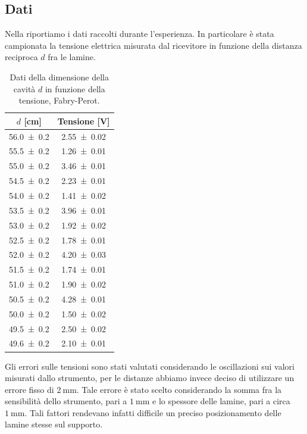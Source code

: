 \documentclass[a4paper]{article}
\begin{document}
\subsection{Dati}
Nella  riportiamo i dati raccolti durante l'esperienza. In particolare è stata campionata la tensione elettrica misurata dal ricevitore in funzione della distanza reciproca $d$ fra le lamine.
\begin{table}[H]
\centering
\caption{Dati della dimensione della cavità $d$ in funzione della tensione, Fabry-Perot.}
\label{tab:dati_Fabry_Perot}
\begin{tabular}{|c|c|}
\hline $d$ [\si{\centi\metre}] & Tensione [\si{\volt}] \\
\hline
\num{56.0 \pm 0.2} & \num{2.55 \pm 0.02} \\
\num{55.5 \pm 0.2} & \num{1.26 \pm 0.01} \\
\num{55.0 \pm 0.2} & \num{3.46 \pm 0.01} \\
\num{54.5 \pm 0.2} & \num{2.23 \pm 0.01} \\
\num{54.0 \pm 0.2} & \num{1.41 \pm 0.02} \\
\num{53.5 \pm 0.2} & \num{3.96 \pm 0.01} \\
\num{53.0 \pm 0.2} & \num{1.92 \pm 0.02} \\
\num{52.5 \pm 0.2} & \num{1.78 \pm 0.01} \\
\num{52.0 \pm 0.2} & \num{4.20 \pm 0.03} \\
\num{51.5 \pm 0.2} & \num{1.74 \pm 0.01} \\
\num{51.0 \pm 0.2} & \num{1.90 \pm 0.02} \\
\num{50.5 \pm 0.2} & \num{4.28 \pm 0.01} \\
\num{50.0 \pm 0.2} & \num{1.50 \pm 0.02} \\
\num{49.5 \pm 0.2} & \num{2.50 \pm 0.02} \\
\num{49.6 \pm 0.2} & \num{2.10 \pm 0.01} \\
\hline
\end{tabular}
\end{table}
Gli errori sulle tensioni sono stati valutati considerando le oscillazioni sui valori misurati dallo strumento, per le distanze abbiamo invece deciso di utilizzare un errore fisso di $\SI{2}{\milli\metre}$. Tale errore è stato scelto considerando la somma fra la sensibilità dello strumento, pari a $\SI{1}{\milli\metre}$ e lo spessore delle lamine, pari a circa $\SI{1}{\milli\metre}$. Tali fattori rendevano infatti difficile un preciso posizionamento delle lamine stesse sul supporto.
\end{document}
